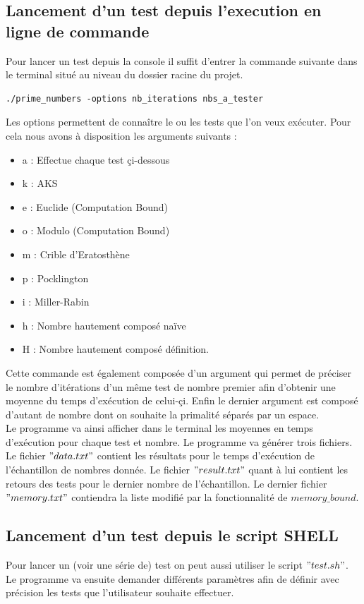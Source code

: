 		 \subsection{Lancement d'un test depuis l'execution en ligne de commande}
Pour lancer un test depuis la console il suffit d'entrer la commande suivante dans le terminal situé au niveau du dossier racine du projet.
\begin{lstlisting}
./prime_numbers -options nb_iterations nbs_a_tester \end{lstlisting}

Les options permettent de connaître le ou les tests que l'on veux exécuter. Pour cela nous avons à disposition les arguments suivants :
\begin{itemize}
\item a : Effectue chaque test çi-dessous
\item k : AKS
\item e : Euclide (Computation Bound)
\item o : Modulo (Computation Bound)
\item m : Crible d'Eratosthène
\item p : Pocklington
\item i : Miller-Rabin
\item h : Nombre hautement composé naïve
\item H : Nombre hautement composé définition.
\end{itemize}

Cette commande est également composée d'un argument qui permet de préciser le nombre d'itérations d'un même test de nombre premier afin d'obtenir une moyenne du temps d’exécution de celui-çi. Enfin le dernier argument est composé d'autant de nombre dont on souhaite  la primalité séparés par un espace.\\
Le programme va ainsi afficher dans le terminal les moyennes en temps d’exécution pour chaque test et nombre. Le programme va générer trois fichiers. Le fichier $"data.txt"$ contient les résultats pour le temps d'exécution de l'échantillon de nombres donnée. Le fichier $"result.txt"$ quant à lui contient les retours des tests pour le dernier nombre de l'échantillon. Le dernier fichier $"memory.txt"$ contiendra la liste modifié par la fonctionnalité de $memory\_bound$.

\subsection{Lancement d'un test depuis le script SHELL}
Pour lancer un (voir une série de) test on peut aussi utiliser le script $"test.sh"$. \\
Le programme va ensuite demander différents paramètres afin de définir avec précision les tests que l'utilisateur souhaite effectuer. \\

